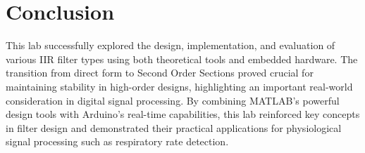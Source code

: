 \documentclass[journal]{IEEEtran}
\begin{document}
\section{Conclusion}
This lab successfully explored the design, implementation, and evaluation of various IIR filter types using both theoretical tools and embedded hardware. The transition from direct form to Second Order Sections proved crucial for maintaining stability in high-order designs, highlighting an important real-world consideration in digital signal processing. By combining MATLAB's powerful design tools with Arduino's real-time capabilities, this lab reinforced key concepts in filter design and demonstrated their practical applications for physiological signal processing such as respiratory rate detection.
\end{document}
